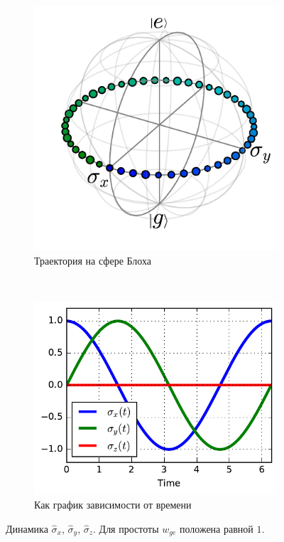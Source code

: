 \documentclass[12pt, twoside]{report}
\numberwithin{equation}{section}
\numberwithin{figure}{section}
\begin{document}
\begin{figure}[!h]
\begingroup
\captionsetup[subfigure]{width=0.9\textwidth, justification=normal}
\centering
\begin{subfigure}[t]{0.45\linewidth}
\centering
\includegraphics[height = \textwidth]{Pictures2/bloch-2pi}
\caption{Траектория на сфере Блоха}
\label{fig:bloch-2pi}
\end{subfigure}~
\begin{subfigure}[t]{0.45\linewidth}
\centering
\includegraphics[height = 0.95\textwidth]{Pictures2/simple-free-2d}
\caption{Как график зависимости от времени}
\label{fig:simple-free-2d}
\end{subfigure}
\endgroup
\caption{Динамика $\hat{\sigma}_x$, $\hat{\sigma}_y$, $\hat{\sigma}_z$. Для простоты $w_{ge}$ положена равной $1$.}
\label{fig:dynamics-free-2d}
\end{figure}
\end{document}
